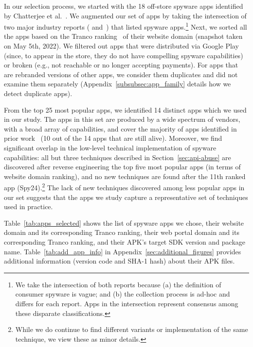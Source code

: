In our selection process, we started with the 18 off-store spyware apps identified by Chatterjee et al.~\cite{chatterjee2018spyware}. We augmented our set of apps by taking the intersection of two major industry reports (\cite{esetandr4:online} and~\cite{Tekstalk86:online}) that listed spyware apps.\footnote{We take the intersection of both reports because (a) the definition of consumer spyware is vague; and (b) the collection process is ad-hoc and differs for each report. Apps in the intersection represent consensus among these disparate classifications.} Next, we sorted all the apps based on the Tranco ranking~\cite{pochat2018tranco} of their website domain (snapshot taken on May 5th, 2022).  We filtered out apps that were distributed via Google Play (since, to appear in
the store, they do not have compelling spyware capabilities)
or broken (e.g., not reachable or no longer accepting payments).
For apps that are rebranded versions of other apps, we consider them duplicates and did not examine them separately (Appendix~\ref{subsubsec:app_family} details how we detect duplicate apps).

From the top 25 most popular apps, we identified 14 distinct apps which we used in our study. The apps in this set are produced by a wide spectrum of vendors, with a broad array of capabilities, and cover the majority of apps identified in prior work~\cite{chatterjee2018spyware} (10 out of the 14 apps that are still alive). Moreover, we find significant overlap in the low-level technical implementation of spyware capabilities:  all but three techniques described in Section~\ref{sec:api-abuse} are discovered after reverse engineering the top five most popular apps (in terms of website domain ranking), and no new techniques are found after the 11th ranked app (Spy24).\footnote{While we do continue to find different variants or implementation of the same technique, we view these as minor details.}
The lack of new techniques discovered among less popular apps in our set suggests that the apps we study capture a representative set of techniques used in practice.


Table~\ref{tab:apps_selected} shows the list of spyware apps we chose, their website domain and its corresponding Tranco ranking, their web portal domain and its corresponding Tranco ranking, and their APK's target SDK version and package name. Table~\ref{tab:add_app_info} in Appendix~\ref{sec:additional_figures} provides additional information (version code and SHA-1 hash) about their APK files.



